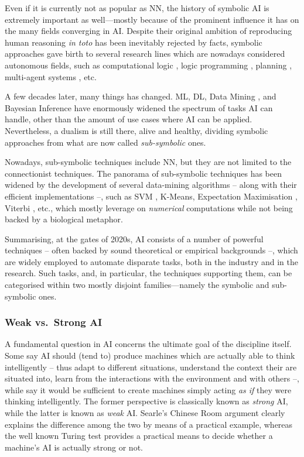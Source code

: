 \documentclass[12pt,a4paper,openright,twoside]{book}
\begin{document}
Even if it is currently not as popular as NN, the history of symbolic AI is extremely important as well---mostly because of the prominent influence it has on the many fields converging in AI.
%
Despite their original ambition of reproducing human reasoning \emph{in toto} has been inevitably rejected by facts, symbolic approaches gave birth to several research lines which are nowadays considered autonomous fields, such as computational logic \cite{lloyd1990computational}, logic programming \cite{apt1990logic}, planning \cite[Chap. 10-11]{russell2016artificial}, multi-agent systems \cite{ferber1999multi}, etc.

A few decades later, many things has changed.
%
ML, DL, Data Mining \cite{hand2006data}, and Bayesian Inference have enormously widened the spectrum of tasks AI can handle, other than the amount of use cases where AI can be applied.
%
Nevertheless, a dualism is still there, alive and healthy, dividing symbolic approaches from what are now called \emph{sub-symbolic}  ones.

Nowadays, sub-symbolic techniques include NN, but they are not limited to the connectionist techniques.
%
The panorama of sub-symbolic techniques has been widened by the development of several data-mining algorithms -- along with their efficient implementations --, such as SVM \cite{Smola2004}, K-Means, Expectation Maximisation \cite{Dempster77maximumlikelihood}, Viterbi \cite{Viterbi06}, etc., which mostly leverage on \emph{numerical} computations while not being backed by a biological metaphor.

Summarising, at the gates of 2020s, AI consists of a number of powerful techniques -- often backed by sound theoretical or empirical backgrounds --, which are widely employed to automate disparate tasks, both in the industry and in the research.
%
Such tasks, and, in particular, the techniques supporting them, can be categorised within two mostly disjoint families---namely the symbolic and sub-symbolic ones.

\subsubsection{Weak vs.\ Strong AI}

A fundamental question in AI concerns the ultimate goal of the discipline itself.
%
Some say AI should (tend to) produce machines which are actually able to think intelligently -- thus adapt to different situations, understand the context their are situated into, learn from the interactions with the environment and with others --, while say it would be sufficient to create machines simply acting \emph{as if} they were thinking intelligently.
%
The former perspective is classically known as \emph{strong} AI, while the latter is known as \emph{weak} AI.
%
Searle's Chinese Room argument \cite{searle1980} clearly explains the difference among the two by means of a practical example, whereas the well known Turing test \cite{Turing1950} provides a practical means to decide whether a machine's AI is actually strong or not.
\end{document}

